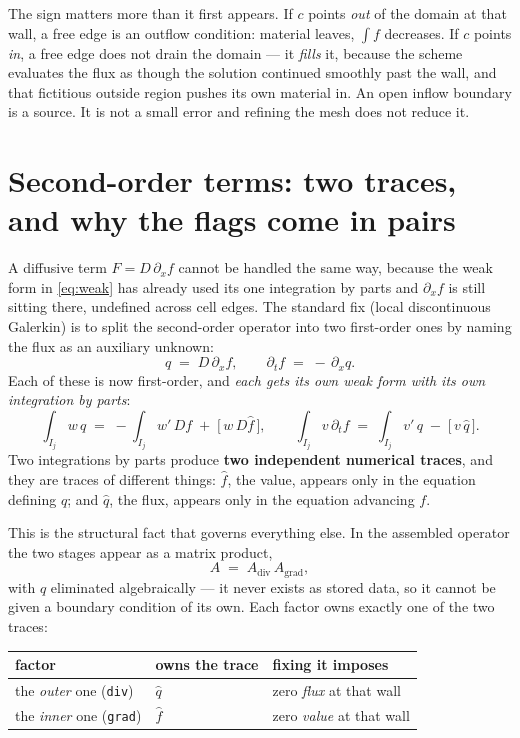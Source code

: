 \documentclass[11pt]{article}
\newcommand{\code}[1]{\texttt{#1}}
\begin{document}
The sign matters more than it first appears. If $c$ points \emph{out} of the
domain at that wall, a free edge is an outflow condition: material leaves,
$\int f$ decreases. If $c$ points \emph{in}, a free edge does not drain the
domain --- it \emph{fills} it, because the scheme evaluates the flux as though
the solution continued smoothly past the wall, and that fictitious outside
region pushes its own material in. An open inflow boundary is a source. It is
not a small error and refining the mesh does not reduce it.

\section{Second-order terms: two traces, and why the flags come in pairs}

A diffusive term $F = D\,\partial_x f$ cannot be handled the same way, because
the weak form in \eqref{eq:weak} has already used its one integration by parts
and $\partial_x f$ is still sitting there, undefined across cell edges. The
standard fix (local discontinuous Galerkin) is to split the second-order
operator into two first-order ones by naming the flux as an auxiliary unknown:
\begin{equation}
  q \;=\; D\,\partial_x f, \qquad \partial_t f \;=\; -\,\partial_x q .
  \label{eq:ldg}
\end{equation}
Each of these is now first-order, and \emph{each gets its own weak form with its
own integration by parts}:
\[
  \int_{I_j} w\,q \;=\; -\!\int_{I_j} w'\,D f \;+\;\big[\,w\,D\widehat f\,\big],
  \qquad
  \int_{I_j} v\,\partial_t f \;=\; \int_{I_j} v'\,q \;-\;\big[\,v\,\widehat q\,\big].
\]
Two integrations by parts produce \textbf{two independent numerical traces}, and
they are traces of different things: $\widehat f$, the value, appears only in the
equation defining $q$; and $\widehat q$, the flux, appears only in the equation
advancing $f$.

This is the structural fact that governs everything else. In the assembled
operator the two stages appear as a matrix product,
\[
  A \;=\; A_{\text{div}}\,A_{\text{grad}},
\]
with $q$ eliminated algebraically --- it never exists as stored data, so it
cannot be given a boundary condition of its own. Each factor owns exactly one
of the two traces:
\begin{center}
\begin{tabular}{@{}lll@{}}
\toprule
factor & owns the trace & fixing it imposes \\
\midrule
the \emph{outer} one (\code{div}) & $\widehat q$ & zero \emph{flux} at that wall \\
the \emph{inner} one (\code{grad}) & $\widehat f$ & zero \emph{value} at that wall \\
\bottomrule
\end{tabular}
\end{center}
\end{document}
